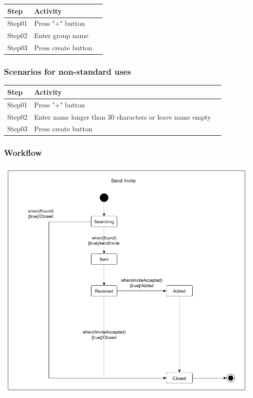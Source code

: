 \documentclass[12pt]{article}
\theoremstyle{definition}
\begin{document}
\begin{tabular}{|l|l|l|}
\hline
Step & Activity \\ \hline
Step01 & Press "+" button\\ \hline
Step02 & Enter group name \\ \hline
Step03 & Press create button\\ \hline
\end{tabular}

\subsubsection{Scenarios for non-standard uses}

\begin{tabular}{|l|l|l|}
\hline
Step & Activity \\ \hline
Step01 & Press "+" button \\ \hline
Step02 & Enter name longer than 30 characters or leave name empty \\ \hline
Step03 & Press create button \\ \hline
\end{tabular}

\subsubsection{Workflow}

\includegraphics[scale=.5]{Images/StateSendInvite.png}
\end{document}
